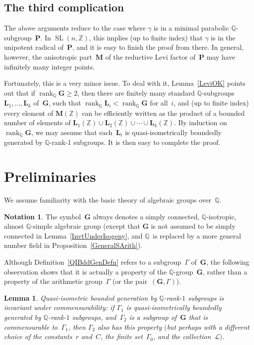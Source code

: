 \documentclass[11pt]{article}
\numberwithin{equation}{section}
\newcommand{\QQ}{\mathbb{Q}}
\newcommand{\ZZ}{\mathbb{Z}}
\newcommand{\Ga}{\mathbf{G}}
\newcommand{\La}{\mathbf{L}}
\newcommand{\Ma}{\mathbf{M}}
\newcommand{\Pa}{\mathbf{P}}
\DeclareMathOperator{\rank}{rank}
\DeclareMathOperator{\SL}{SL}
\newcommand{\subgroups}{\mathcal{L}}
\numberwithin{equation}{section}
\newtheorem{lem}[thm]{Lemma}
\theoremstyle{definition}
\newtheorem{notation}[thm]{Notation}
\begin{document}
\subsection*{The third complication}
The above arguments reduce to the case where $\gamma$ is in a minimal parabolic $\QQ$-subgroup~$\Pa$. In $\SL(n,\ZZ)$, this implies (up to finite index) that $\gamma$ is in the unipotent radical of~$\Pa$, and it is easy to finish the proof from there. In general, however, the anisotropic part~$\Ma$ of the reductive Levi factor of~$\Pa$ may have infinitely many integer points.

Fortunately, this is a very minor issue. To deal with it, Lemma~\ref{LeviOK} points out that if $\rank_\QQ \Ga \ge 2$, then there are finitely many standard $\QQ$-subgroups $\La_1,\ldots,\La_k$ of~$\Ga$, such that $\rank_\QQ \La_i < \rank_\QQ \Ga$ for all~$i$, and (up to finite index) every element of $\Ma(\ZZ)$ can be efficiently written as the product of a bounded number of elements of $\La_1(\ZZ) \cup \La_2(\ZZ) \cup\cdots \cup \La_k(\ZZ)$. By induction on $\rank_\QQ \Ga$, we may assume that each~$\La_i$ is quasi-isometrically boundedly generated by $\QQ$-rank-1 subgroups. It is then easy to complete the proof.

\section{Preliminaries}

 We assume familiarity with the basic theory of algebraic groups over~$\QQ$.

 \begin{notation} \label{GaNotation} The symbol~$\Ga$ always denotes a simply connected, $\QQ$-isotropic, almost $\QQ$-simple algebraic group (except that $\Ga$ is not assumed to be simply connected in Lemma~\ref{InvtUnderIsogeny}, and $\QQ$~is replaced by a more general number field in Proposition~\ref{GeneralSArith}).
 \end{notation}

Although Definition~\ref{QIBddGenDefn} refers to a subgroup~$\Gamma$ of~$\Ga$, the following observation shows that it is actually a property of the $\QQ$-group~$\Ga$, rather than a property of the arithmetic group~$\Gamma$ (or the pair~$(\Ga,\Gamma)$).

\begin{lem} \label{BddCommensurable}\sloppy
Quasi-isometric bounded generation by $\QQ$-rank-$1$ subgroups is invariant under commensurability:
if $\Gamma_1$ is quasi-isometrically boundedly generated by $\QQ$-rank-$1$ subgroups, and~$\Gamma_2$ is a subgroup of~$\Ga$ that is commensurable to~$\Gamma_1$, then $\Gamma_2$ also has this property $($but perhaps with a different choice of the constants~$r$ and~$C$, the finite set~$\Gamma_0$, and the collection~$\subgroups)$.
\end{lem}
\end{document}
